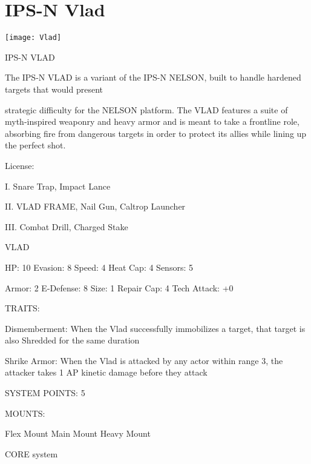 \section{IPS-N Vlad}

\begin{center}
    \texttt{[image: Vlad]}
\end{center}

                                                     IPS-N VLAD

The IPS-N VLAD is a variant of the IPS-N NELSON, built to handle hardened targets that would present

strategic difficulty for the NELSON platform. The VLAD features a suite of myth-inspired weaponry and
heavy armor and is meant to take a frontline role, absorbing fire from dangerous targets in order to protect
its allies while lining up the perfect shot.




                                                      License:

I. Snare Trap, Impact Lance

II. VLAD FRAME, Nail Gun, Caltrop Launcher

III. Combat Drill, Charged Stake


                                                       VLAD

  HP: 10          Evasion: 8                              Speed: 4            Heat Cap: 4         Sensors: 5

  Armor: 2        E-Defense: 8                            Size: 1             Repair Cap: 4       Tech Attack:
                                                                                                  +0

                                                      TRAITS:

  Dismemberment: When the Vlad successfully immobilizes a target, that target is also Shredded for the
  same duration

  Shrike Armor: When the Vlad is attacked by any actor within range 3, the attacker takes 1 AP kinetic
  damage before they attack

                                                SYSTEM POINTS: 5

                                                      MOUNTS:

  Flex Mount                          Main Mount                               Heavy Mount

                                                   CORE system

